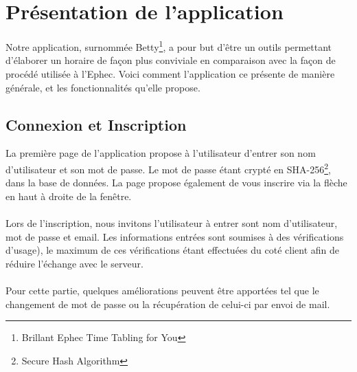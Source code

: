 \chapter{Présentation de l'application}
Notre application, surnommée Betty\footnote{Brillant Ephec Time Tabling for You}, a pour but d'être un outils permettant d'élaborer un horaire de façon plus conviviale en comparaison avec la façon de procédé utilisée à l'Ephec. Voici comment l'application ce présente de manière générale, et les fonctionnalités qu'elle propose.

\section{Connexion et Inscription}

La première page de l'application propose à l'utilisateur d'entrer son nom d'utilisateur et son mot de passe. Le mot de passe étant crypté en SHA-256\footnote{Secure Hash Algorithm}, dans la base de données. La page propose également de vous inscrire via la flèche en haut à droite de la fenêtre.\\
\\
Lors de l'inscription, nous invitons l'utilisateur à entrer sont nom d'utilisateur, mot de passe et email. Les informations entrées sont soumises à des vérifications d'usage), le maximum de ces vérifications étant effectuées du coté client afin de réduire l'échange avec le serveur.\\
\\
Pour cette partie, quelques améliorations peuvent être apportées tel que le changement de mot de passe ou la récupération de celui-ci par envoi de mail.

